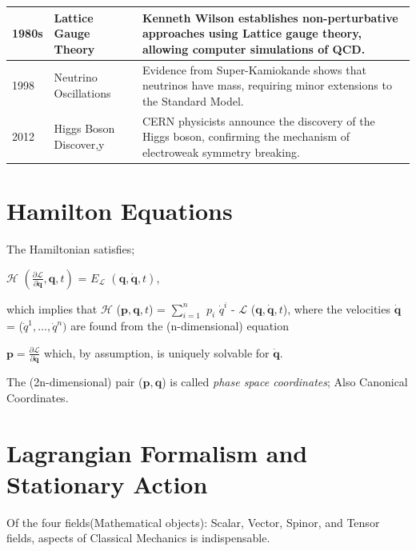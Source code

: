 \documentclass[a4paper, 10pt, onepage]{elegantbook}
\begin{document}
{\begin{longtable}{p{} p{} p{}}
\midrule
1980s & Lattice Gauge Theory & Kenneth Wilson establishes non-perturbative approaches using Lattice gauge theory, 
allowing computer simulations of QCD. \\
\midrule
1998 & Neutrino Oscillations & Evidence from Super-Kamiokande shows that neutrinos have mass, requiring minor 
extensions to the Standard Model. \\
\midrule
2012 & Higgs Boson Discover,y & CERN physicists announce the discovery of the Higgs boson, confirming the mechanism of 
electroweak symmetry breaking. \\
\bottomrule
\end{longtable}

\newpage

\section{Hamilton Equations}

The Hamiltonian satisfies;  

$\mathcal {H}$ $\left(\frac{\partial \mathcal{L}}{\partial \boldsymbol \dot{q}}, {\boldsymbol {q}},t \right)$ = 
$E_{\mathcal{L}}$ $({\boldsymbol {q}},{\boldsymbol {\dot{q}}},t)$, 

which implies that $\mathcal{H}$ (${\boldsymbol {p}},{\boldsymbol {q}},t$) = $\sum_{i=1}^{n}$ $p_{i}$ ${\dot{q}}^{i}$ - 
$\mathcal{L}$ ($\boldsymbol {q},\boldsymbol \dot{q},t$), where the velocities $\boldsymbol \dot{q}$ = (${\dot{q}}^{1}, 
\ldots, \dot{q}^{n})$ are found from the (n-dimensional) equation  


$\mathbf{p} = \frac{\partial \mathcal{L}}{\partial \mathbf{\dot{q}}}$ which, by assumption, is uniquely solvable for 
$\mathbf{\dot{q}}$. 

The (2n-dimensional) pair ($\boldsymbol {p},\boldsymbol {q}$) is called \emph{phase space coordinates}; Also Canonical 
Coordinates.

\section{Lagrangian Formalism and Stationary Action}
\label{sec:Lagrangian Formalism and Stationary Action}

Of the four fields(Mathematical objects): Scalar, Vector, Spinor, and Tensor fields, aspects of Classical Mechanics is 
indispensable.  

}
\end{document}
